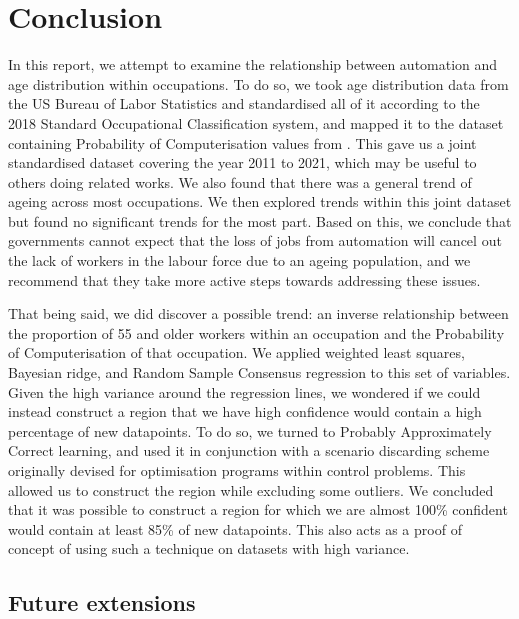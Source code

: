\documentclass[11pt]{article}
\begin{document}
\clearpage

\section{Conclusion}
In this report, we attempt to examine the relationship between automation and age distribution within occupations. To do so, we took age distribution data from the US Bureau of Labor Statistics and standardised all of it according to the 2018 Standard Occupational Classification system, and mapped it to the dataset containing Probability of Computerisation values from \cite{osborne2017future}. This gave us a joint standardised dataset covering the year 2011 to 2021, which may be useful to others doing related works. We also found that there was a general trend of ageing across most occupations. We then explored trends within this joint dataset but found no significant trends for the most part. Based on this, we conclude that governments cannot expect that the loss of jobs from automation will cancel out the lack of workers in the labour force due to an ageing population, and we recommend that they take more active steps towards addressing these issues.

That being said, we did discover a possible trend: an inverse relationship between the proportion of 55 and older workers within an occupation and the Probability of Computerisation of that occupation. We applied weighted least squares, Bayesian ridge, and Random Sample Consensus regression to this set of variables. Given the high variance around the regression lines, we wondered if we could instead construct a region that we have high confidence would contain a high percentage of new datapoints. To do so, we turned to Probably Approximately Correct learning, and used it in conjunction with a scenario discarding scheme originally devised for optimisation programs within control problems. This allowed us to construct the region while excluding some outliers. We concluded that it was possible to construct a region for which we are almost 100\% confident would contain at least 85\% of new datapoints. This also acts as a proof of concept of using such a technique on datasets with high variance.


\subsection*{Future extensions}

\clearpage

\printbibliography[heading=bibintoc]
\end{document}

